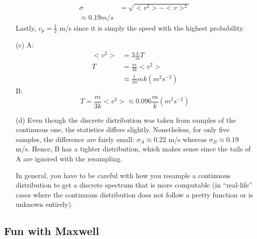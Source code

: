 \documentclass{article}
\begin{document}
\begin{itemize}
\begin{align*}
	\sigma &= \sqrt{<v^2>-<v>^2} \\
	\approx 0.19 m/s
	\end{align*}
	Lastly, $v_p = \frac{1}{2}$ m/s since it is simply the speed with the highest probability.
	\item[(c)] A:
	\begin{align*}
	<v^2> &= 3\frac{k}{m}T \\
	T &= \frac{m}{3k}<v^2> \\
	&\approx \frac{1}{10}{m}{k} (m^2 s^{-2})
	\end{align*}
	B:
	\begin{equation}
	T = \frac{m}{3k}<v^2> \approx 0.096\frac{m}{k} (m^2 s^{-2})
	\end{equation}
	\item[(d)] Even though the discrete distribution was taken from samples of the continuous one, the statistics differe slightly. Nonetheless, for only five samples, the difference are fairly small: $\sigma_A\approx0.22$ m/s whereas $\sigma_B\approx0.19$ m/s. Hence, B has a tighter distribution, which makes sense since the tails of A are ignored with the resampling.
	
	In general, you have to be careful with how you resample a continuous distribution to get a discrete spectrum that is more computable (in ``real-life'' cases where the continuous distribution does not follow a pretty function or is unknown entirely).
\end{itemize}

\subsection{Fun with Maxwell}
\end{document}
